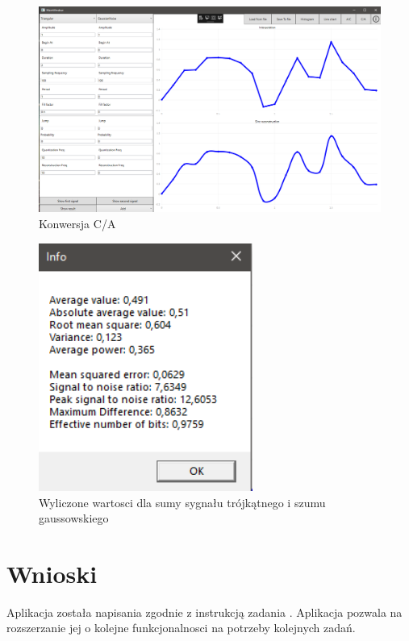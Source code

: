 \documentclass[12pt]{article}
\begin{document}
\begin{figure}[H]
 \centering
 \includegraphics[width=14cm]{images/addca.PNG}
 \vspace{-0.3cm}
 \caption{Konwersja C/A}
 \label{gui}
\end{figure}

\begin{figure}[H]
 \centering
 \includegraphics[width=7cm]{images/addinfo.PNG}
 \vspace{-0.3cm}
 \caption{Wyliczone wartosci dla  sumy sygnału trójkątnego i szumu gaussowskiego}
 \label{gui}
\end{figure}




\newpage

\section{Wnioski}

Aplikacja została napisania zgodnie z instrukcją zadania \cite{zad}. Aplikacja pozwala na rozszerzanie jej o kolejne funkcjonalnosci na potrzeby kolejnych zadań. 
\end{document}
